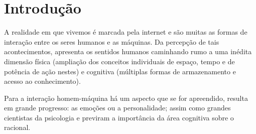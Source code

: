 \documentclass[
    12pt,                   %
    openright,              %
    oneside,                %
    a4paper,                %
    sumario=tradicional,    %
    english,                %
    brazil,                 %
    ]{abntex2}
\begin{document}
\listoffigures*
\cleardoublepage

\listoftables*
\cleardoublepage





\tableofcontents*
\cleardoublepage

\textual

\chapter{Introdução}\label{sec:introducao}
A realidade em que vivemos é marcada pela internet e são muitas as formas de interação entre os seres humanos e as máquinas. Da percepção de tais acontecimentos,   apresenta os sentidos humanos caminhando rumo a uma inédita dimensão física (ampliação dos conceitos individuais de espaço, tempo e de potência de ação nestes) e cognitiva (múltiplas formas de armazenamento e acesso ao conhecimento).

Para a interação homem-máquina há um aspecto que se for apreendido, resulta em grande progresso: as emoções ou a personalidade; assim como grandes cientistas da psicologia \cite{damasio2012erro,goleman1995inteligencia}  e \cite{dalgleish2000handbook,lane2002cognitive}  previram a importância da área cognitiva sobre o racional.
\end{document}
